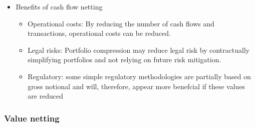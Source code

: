 \begin{itemize}
\begin{itemize}
\end{itemize}

\item Benefits of cash flow netting
\begin{itemize}
    \item Operational costs: By reducing the number of cash flows and transactions, operational costs can be reduced.
    \item Legal risks: Portfolio compression may reduce legal risk by contractually simplifying portfolios and not relying on future risk mitigation.
    \item Regulatory: some simple regulatory methodologies are partially based on gross notional and will, therefore, appear more benefcial if these values are reduced
\end{itemize}



\end{itemize}


\subsubsection{Value netting}

